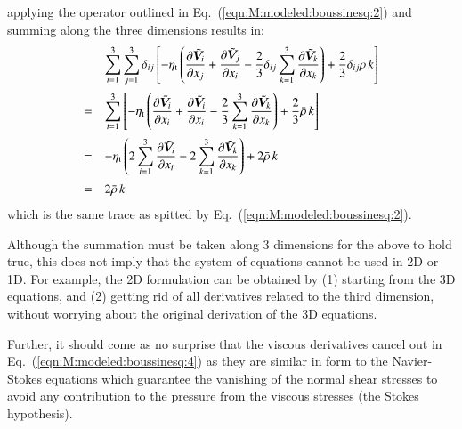 \documentclass{warpdoc}
\newcommand{\alb}{\vspace{0.2cm}\\} %
\newcommand{\turb}{_{\rm t}}
\newcommand{\etat}{{\eta\turb}}
\newcommand{\mfd}{\displaystyle}
\begin{document}
%
applying the operator outlined in Eq.\ (\ref{eqn:M:modeled:boussinesq:2}) and summing along
the three dimensions results in:
%
\begin{equation}
 \begin{array}{cl}
    &\mfd\sum_{i=1}^{3} \sum_{j=1}^{3} \delta_{ij}
    \left[
       -\etat \left(
             \frac{\partial {\wtilde{\bm{V}}_i}}{\partial x_j}
          +\frac{\partial {\wtilde{\bm{V}}_j}}{\partial x_i}
          -\frac{2}{3}  \delta_{ij} \sum_{k=1}^3 \frac{\partial {\wtilde{\bm{V}}_k}}{\partial x_k}
           \right)
       + \frac{2}{3} \delta_{ij} \wbar{\rho}\, k
    \right] \alb
  =&\mfd\sum_{i=1}^{3}
    \left[
       -\etat \left(
             \frac{\partial {\wtilde{\bm{V}}_i}}{\partial x_i}
          +\frac{\partial {\wtilde{\bm{V}}_i}}{\partial x_i}
          -\frac{2}{3} \sum_{k=1}^3 \frac{\partial {\wtilde{\bm{V}}_k}}{\partial x_k}
           \right)
       + \frac{2}{3} \wbar{\rho}\, k
    \right] \alb
  =&\mfd
       -\etat \left(
           2 \sum_{i=1}^3 \frac{\partial {\wtilde{\bm{V}}_i}}{\partial x_i}
          -2 \sum_{k=1}^3 \frac{\partial {\wtilde{\bm{V}}_k}}{\partial x_k}
           \right)
       + 2  \wbar{\rho}\, k\alb
  =&\mfd 2  \wbar{\rho}\, k
 \end{array}
  \label{eqn:M:modeled:boussinesq:4}
\end{equation}
%
which is the same trace as spitted by Eq.\ (\ref{eqn:M:modeled:boussinesq:2}).

Although the summation must be taken along 3 dimensions for the above to hold true,
this does not imply that the system of equations cannot be used in 2D or 1D.
For example, the 2D formulation can be obtained by (1) starting from the 3D equations,
and (2) getting rid of all derivatives related to the third dimension,
without worrying about the original derivation of the 3D equations.

Further, it should come as no surprise that the viscous derivatives cancel out
in Eq.\ (\ref{eqn:M:modeled:boussinesq:4}) as they are similar in form to the Navier-Stokes
equations which guarantee the vanishing of the normal shear stresses
to avoid any contribution to the pressure from the viscous stresses
(the Stokes hypothesis).
\end{document}
